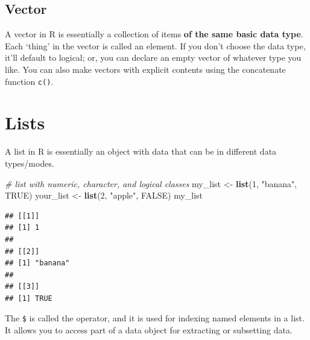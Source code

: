 \documentclass[
]{book}
\newenvironment{Shaded}{\begin{snugshade}}{\end{snugshade}}
\newcommand{\CommentTok}[1]{\textcolor[rgb]{0.56,0.35,0.01}{\textit{#1}}}
\newcommand{\ConstantTok}[1]{\textcolor[rgb]{0.56,0.35,0.01}{#1}}
\newcommand{\DecValTok}[1]{\textcolor[rgb]{0.00,0.00,0.81}{#1}}
\newcommand{\FunctionTok}[1]{\textcolor[rgb]{0.13,0.29,0.53}{\textbf{#1}}}
\newcommand{\NormalTok}[1]{#1}
\newcommand{\OtherTok}[1]{\textcolor[rgb]{0.56,0.35,0.01}{#1}}
\newcommand{\SpecialCharTok}[1]{\textcolor[rgb]{0.81,0.36,0.00}{\textbf{#1}}}
\newcommand{\StringTok}[1]{\textcolor[rgb]{0.31,0.60,0.02}{#1}}
\begin{document}
\subsection{Vector}\label{vector}

A vector in R is essentially a collection of items \textbf{of the same basic
data type}. Each `thing' in the vector is called an element. If you don't
choose the data type, it'll default to logical; or, you can declare an
empty vector of whatever type you like. You can also make vectors with
explicit contents using the concatenate function \texttt{c()}.

\section{Lists}\label{lists}

A list in R is essentially an object with data that can be in different data types/modes.

\begin{Shaded}
\begin{Highlighting}[]
\CommentTok{\# list with numeric, character, and logical classes}
\NormalTok{my\_list }\OtherTok{\textless{}{-}} \FunctionTok{list}\NormalTok{(}\DecValTok{1}\NormalTok{, }\StringTok{"banana"}\NormalTok{, }\ConstantTok{TRUE}\NormalTok{)}
\NormalTok{your\_list }\OtherTok{\textless{}{-}} \FunctionTok{list}\NormalTok{(}\DecValTok{2}\NormalTok{, }\StringTok{"apple"}\NormalTok{, }\ConstantTok{FALSE}\NormalTok{)}
\NormalTok{my\_list}
\end{Highlighting}
\end{Shaded}

\begin{verbatim}
## [[1]]
## [1] 1
## 
## [[2]]
## [1] "banana"
## 
## [[3]]
## [1] TRUE
\end{verbatim}

The \texttt{\$} is called the operator, and it is used for indexing named elements in a list. It allows you to access part of a data object for extracting or subsetting data.

\begin{Shaded}
\end{Shaded}
\end{document}
